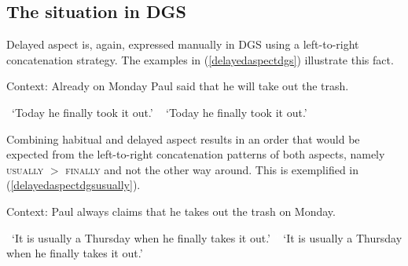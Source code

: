 \subsection{The situation in DGS}
Delayed aspect is, again, expressed manually in DGS using a left-to-right concatenation strategy. The examples in (\ref{delayedaspectdgs}) illustrate this fact.

\begin{exe}
\ex Context: Already on Monday Paul said that he will take out the trash.\label{delayedaspectdgs}
\begin{xlist} 
\glt \textcolor{white}{*}`Today he finally took it out.' \label{ex:delayedaspectdgsa}
\glt\textcolor{white}{*} `Today he finally took it out.' \label{ex:delayedaspectdgsb}
\end{xlist}
\end{exe}  

\noindent Combining habitual and delayed aspect results in an order that would be expected from the left-to-right concatenation patterns of both aspects, namely \textsc{usually} $>$ \textsc{finally} and not the other way around. This is exemplified in (\ref{delayedaspectdgsusually}).

\vspace{0.5cm}

\begin{exe}
\ex Context: Paul always claims that he takes out the trash on Monday.\label{delayedaspectdgsusually}
\begin{xlist} 
\glt \textcolor{white}{*}`It is usually a Thursday when he finally takes it out.' \label{ex:delayedaspectdgsusuallya}
\glt\textcolor{white}{*} `It is usually a Thursday when he finally takes it out.' \label{ex:delayedaspectdgsusuallyb}
\end{xlist}
\end{exe}  

